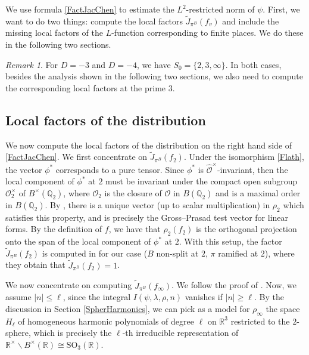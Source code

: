 \documentclass[11pt]{amsart}
\newcommand{\bigo}{\mathcal{O}}
\newcommand{\R}{\mathbb{R}}
\newcommand{\Q}{\mathbb{Q}}
\theoremstyle{definition}
\theoremstyle{remark}
\newtheorem{remark}[theorem]{Remark}
\begin{document}
We use formula \eqref{FactJacChen} to estimate the $L^2$-restricted norm of $\psi$. First, we want to do two things: compute the local factors $\tilde{J}_{\pi^B}(f_v)$ and include the missing local factors of the $L$-function corresponding to finite places. We do these in the following two sections.

\begin{remark}
For $D=-3$ and $D=-4$, we have $S_0 = \{2,3,\infty\}$. In both cases, besides the analysis shown in the following two sections, we also need to compute the corresponding local factors at the prime $3$.
\end{remark}




\subsection{Local factors of the distribution}

We now compute the local factors of the distribution on the right hand side of \eqref{FactJacChen}. We first concentrate on $\tilde{J}_{\pi^B}(f_2)$. Under the isomorphism \eqref{Flath}, the vector $\phi^{*}$ corresponds to a pure tensor. Since $\phi^{*}$ is $\widehat{\bigo}^{\times}$-invariant, then the local component of $\phi^{*}$ at $2$ must be invariant under the compact open subgroup $\bigo_{2}^{\times}$ of $B^{\times}(\Q_2)$, where $\bigo_2$ is the closure of $\bigo$ in $B(\Q_2)$ and is a maximal order in $B(\Q_2)$. By \cite[Prop. 2.6]{GrossPrasad1991}, there is a unique vector (up to scalar multiplication) in $\rho_2$ which satisfies this property, and is precisely the Gross--Prasad test vector for linear forms. By the definition of $f$, we have that $\rho_2(f_2)$ is the orthogonal projection onto the span of the local component of $\phi^{*}$ at $2$. With this setup, the factor $\tilde{J}_{\pi^B}(f_2)$ is computed in \cite[\S 2.2, 2.2.1]{MartinWhitehouse} for our case ($B$ non-split at $2$, $\pi$ ramified at $2$), where they obtain that $\tilde{J}_{\pi^B}(f_2)=1$.

We now concentrate on computing $\tilde{J}_{\pi^B}(f_{\infty})$. We follow the proof of \cite[Lemma 8]{Magee}. Now, we assume $|n|\leq \ell$, since the integral $I(\psi,\lambda, \rho, n)$ vanishes if $|n|\geq \ell$. By the discussion in Section \ref{SpherHarmonics}, we can pick as a model for $\rho_{\infty}$ the space $H_{\ell}$ of homogeneous harmonic polynomials of degree $\ell$ on $\R^3$ restricted to the $2$-sphere, which is precisely the $\ell$-th irreducible representation of $\R^{\times} \backslash B^{\times}(\R) \cong \mathrm{SO}_3(\R)$. 
\end{document}
